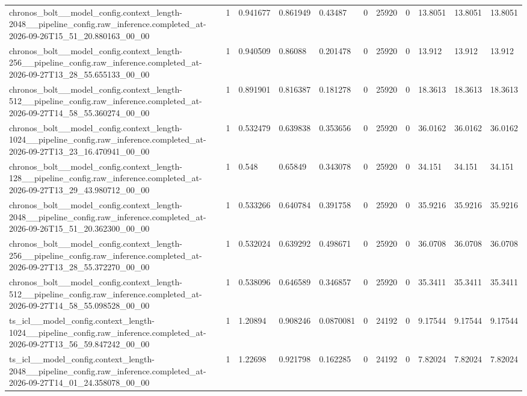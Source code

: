 \begin{tabular}{lllllllllll}
chronos\_bolt\_\_model\_config.context\_length-2048\_\_pipeline\_config.raw\_inference.completed\_at-2026-09-26T15\_51\_20.880163\_00\_00 & 1 & 0.941677 & 0.861949 & 0.43487 & 0 & 25920 & 0 & 13.8051 & 13.8051 & 13.8051 \\
chronos\_bolt\_\_model\_config.context\_length-256\_\_pipeline\_config.raw\_inference.completed\_at-2026-09-27T13\_28\_55.655133\_00\_00 & 1 & 0.940509 & 0.86088 & 0.201478 & 0 & 25920 & 0 & 13.912 & 13.912 & 13.912 \\
chronos\_bolt\_\_model\_config.context\_length-512\_\_pipeline\_config.raw\_inference.completed\_at-2026-09-27T14\_58\_55.360274\_00\_00 & 1 & 0.891901 & 0.816387 & 0.181278 & 0 & 25920 & 0 & 18.3613 & 18.3613 & 18.3613 \\
chronos\_bolt\_\_model\_config.context\_length-1024\_\_pipeline\_config.raw\_inference.completed\_at-2026-09-27T13\_23\_16.470941\_00\_00 & 1 & 0.532479 & 0.639838 & 0.353656 & 0 & 25920 & 0 & 36.0162 & 36.0162 & 36.0162 \\
chronos\_bolt\_\_model\_config.context\_length-128\_\_pipeline\_config.raw\_inference.completed\_at-2026-09-27T13\_29\_43.980712\_00\_00 & 1 & 0.548 & 0.65849 & 0.343078 & 0 & 25920 & 0 & 34.151 & 34.151 & 34.151 \\
chronos\_bolt\_\_model\_config.context\_length-2048\_\_pipeline\_config.raw\_inference.completed\_at-2026-09-26T15\_51\_20.362300\_00\_00 & 1 & 0.533266 & 0.640784 & 0.391758 & 0 & 25920 & 0 & 35.9216 & 35.9216 & 35.9216 \\
chronos\_bolt\_\_model\_config.context\_length-256\_\_pipeline\_config.raw\_inference.completed\_at-2026-09-27T13\_28\_55.372270\_00\_00 & 1 & 0.532024 & 0.639292 & 0.498671 & 0 & 25920 & 0 & 36.0708 & 36.0708 & 36.0708 \\
chronos\_bolt\_\_model\_config.context\_length-512\_\_pipeline\_config.raw\_inference.completed\_at-2026-09-27T14\_58\_55.098528\_00\_00 & 1 & 0.538096 & 0.646589 & 0.346857 & 0 & 25920 & 0 & 35.3411 & 35.3411 & 35.3411 \\
ts\_icl\_\_model\_config.context\_length-1024\_\_pipeline\_config.raw\_inference.completed\_at-2026-09-27T13\_56\_59.847242\_00\_00 & 1 & 1.20894 & 0.908246 & 0.0870081 & 0 & 24192 & 0 & 9.17544 & 9.17544 & 9.17544 \\
ts\_icl\_\_model\_config.context\_length-2048\_\_pipeline\_config.raw\_inference.completed\_at-2026-09-27T14\_01\_24.358078\_00\_00 & 1 & 1.22698 & 0.921798 & 0.162285 & 0 & 24192 & 0 & 7.82024 & 7.82024 & 7.82024 \\

\end{tabular}
